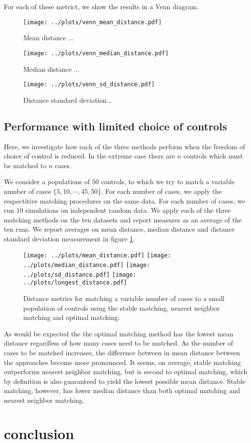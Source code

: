 \documentclass{article}
\begin{document}
For each of these metrict, we show the results in a Venn diagram.

\begin{figure}
\caption{Mean distance ...}
\texttt{[image: ../plots/venn\_mean\_distance.pdf]}
\end{figure}

\begin{figure}
\caption{Median distance ...}
\texttt{[image: ../plots/venn\_median\_distance.pdf]}
\end{figure}

\begin{figure}
\caption{Distance standard deviation...}
\texttt{[image: ../plots/venn\_sd\_distance.pdf]}
\end{figure}



\subsection{Performance with limited choice of controls}

Here, we investigate how each of the three methods perform when the freedom of choice of control is reduced. 
In the extreme case there are $n$ controls which must be matched to $n$ cases.

We consider a populations of $50$ controls, to which we try to match a variable number of cases $\{5, 10, \cdots, 45, 50\}$.
For each number of cases, we apply the respectitive matching procedures on the same data. 
For each number of cases, we run 10 simulations on independent random data. We apply each of the three matching methods
on the ten datasets and report measures as an average of the ten runs. We report averages on mean distance, median distance 
and distance standard deviation measurement in figure \ref{fig:variable.match.controls}. 

\begin{figure}[htb]
\label{fig:variable.match.controls}
\texttt{[image: ../plots/mean\_distance.pdf]}
\texttt{[image: ../plots/median\_distance.pdf]}
\texttt{[image: ../plots/sd\_distance.pdf]}
\texttt{[image: ../plots/longest\_distance.pdf]}
\caption{Distance metrics for matching a variable number of cases to a small population of controls using the stable matching, nearest neighbor matching and optimal matching. }
\end{figure}

As would be expected the the optimal matching method has the lowest mean distance regardless of how many cases need to be matched. As the number of cases to be matched increases, the difference between in mean distance between the approaches become more pronounced. It seems, on average, stable matching outperforms nearest neighbor matching, but is second to optimal matching, which by definition is also guaranteed to yield the lowest possible mean distance. Stable matching, however, has lower median distance than both optimal matching and nearest neighbor matching. 

\section{conclusion}
\end{document}
